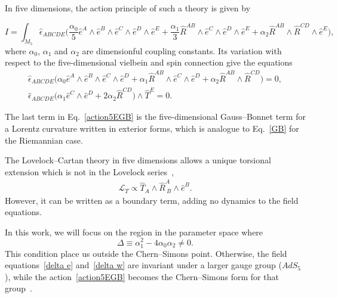 \documentclass[aps,prd,12pt,superscriptaddress,showpacs,showkeys,longbibliography,reprint,nofootinbib]{revtex4-1}
\begin{document}
In five dimensions, the action principle of such a theory is given by  
\begin{widetext}
  \begin{equation}
    \label{action5EGB}
    I = \int_{M_5} \hat{\epsilon}_{ABCDE} \Big(\frac{\alpha_0}{5}\hat{e}^A\wedge\hat{e}^B\wedge\hat{e}^C\wedge
    \hat{e}^D\wedge\hat{e}^E
    +\frac{\alpha_1}{3}\hat{R}^{AB}\wedge\hat{e}^C\wedge\hat{e}^D\wedge\hat{e}^E
    +\alpha_2\hat{R}^{AB}\wedge\hat{R}^{CD}
    \wedge\hat{e}^E\Big),
  \end{equation}
  where $\alpha_0$, $\alpha_1$ and $\alpha_2$ are dimensionful coupling constants. Its variation with respect to the five-dimensional vielbein and spin connection give the equations
  \begin{gather}
    \label{delta e}
    \hat{\epsilon}_{ABCDE}\Big(\alpha_0\hat{e}^A\wedge\hat{e}^B\wedge\hat{e}^C\wedge\hat{e}^D
    + \alpha_1\hat{R}^{AB}\wedge\hat{e}^C\wedge\hat{e}^D
    + \alpha_2\hat{R}^{AB}\wedge\hat{R}^{CD}\Big)=0,
    \\
    \label{delta w}
    \hat{\epsilon}_{ABCDE}\Big(\alpha_1\hat{e}^C\wedge\hat{e}^D+
    2\alpha_2\hat{R}^{CD}\Big)\wedge\hat{T}^E=0.
  \end{gather}
\end{widetext}

The last term in Eq.~\eqref{action5EGB} is the five-dimensional Gauss--Bonnet term for a Lorentz curvature written in exterior forms, which is analogue to Eq.~\eqref{GB} for the Riemannian case.

The Lovelock--Cartan theory in five dimensions allows a unique torsional extension which is not in the Lovelock series~\cite{Mardones:1990qc},
\begin{align}
  \label{boundary}
  \mathcal{L}_{T} \propto \hat{T}_A\wedge \hat{R}^A_{\ B}\wedge\hat{e}^B.
\end{align}
However, it can be written as a boundary term, adding no dynamics to the field equations.

In this work, we will focus on the region in the parameter space where
\begin{equation}
  \label{delta}
  \Delta\equiv\alpha_1^2-4\alpha_0\alpha_2\neq 0.
\end{equation}
This condition place us outside the Chern--Simons point. Otherwise, the field equations~\eqref{delta e} and~\eqref{delta w} are invariant under a larger gauge group ($AdS_5$), while the action~\eqref{action5EGB} becomes the Chern--Simons form for that group~\cite{Zanelli:2005sa,*Troncoso:1999pk}. 
\end{document}
